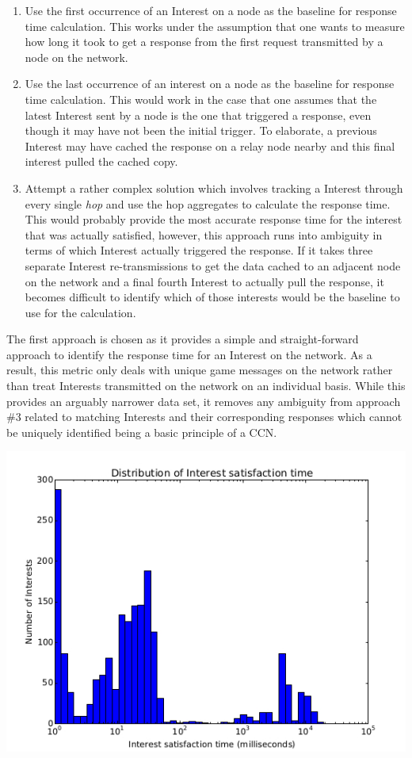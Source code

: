 \documentclass[a4paper,12pt]{report}      %
\begin{document}
\begin{enumerate}
\item Use the first occurrence of an Interest on a node as the baseline for response time calculation. This
works under the assumption that one wants to measure how long it took to get a response from the first
request transmitted by a node on the network.
\item Use the last occurrence of an interest on a node as the baseline for response time calculation. This
would work in the case that one assumes that the latest Interest sent by a node is the one that triggered a
response, even though it may have not been the initial trigger. To elaborate, a previous Interest may have cached
 the response on a relay node nearby and this final interest pulled the cached copy.
\item Attempt a rather complex solution which involves tracking a Interest through every single \textsl{hop} and
use the hop aggregates to calculate the response time. This would probably provide the most accurate
response time for the interest that was actually satisfied, however, this approach runs into ambiguity in
terms of which Interest actually triggered the response. If it takes three separate Interest re-transmissions to
get the data cached to an adjacent node on the network and a final fourth Interest to actually pull the
response, it becomes difficult to identify which of those interests would be the baseline to use for the
calculation.
\end{enumerate}

The first approach is chosen as it provides a simple and straight-forward approach to identify the
response time for an Interest on the network. As a result, this metric only deals with unique game
messages on the network rather than treat Interests transmitted on the network on an individual
basis. While this provides an arguably narrower data set, it removes any ambiguity from approach \#3
related to matching Interests and their corresponding responses which cannot be uniquely identified
being a basic principle of a CCN.

\includegraphics[scale=0.73]{InterestResponseTimeHist.jpg}
\end{document}
